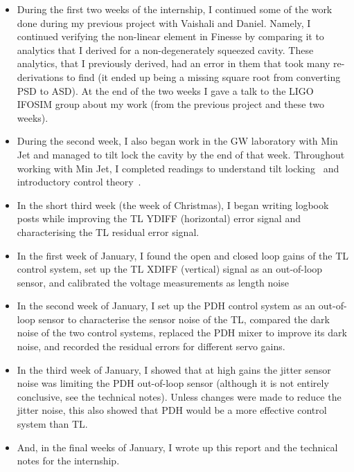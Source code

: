\documentclass[aps,pra,superscriptaddress,reprint,nofootinbib]{revtex4-1}
\begin{document}
\begin{itemize}
\item During the first two weeks of the internship, I continued some of the work done during my previous project with Vaishali and Daniel. Namely, I continued verifying the non-linear element in Finesse by comparing it to analytics that I derived for a non-degenerately squeezed cavity. These analytics, that I previously derived, had an error in them that took many re-derivations to find (it ended up being a missing square root from converting PSD to ASD).
At the end of the two weeks I gave a talk to the LIGO IFOSIM group about my work (from the previous project and these two weeks).
\item During the second week, I also began work in the GW laboratory with Min Jet and managed to tilt lock the cavity by the end of that week. Throughout working with Min Jet, I completed readings to understand tilt locking~\cite{TL:1999} and introductory control theory~\cite{Ward:2010,Bechhoefer:2005,FCS:2000}.
\item In the short third week (the week of Christmas), I began writing logbook posts while improving the TL YDIFF (horizontal) error signal and characterising the TL residual error signal.
\item In the first week of January, I found the open and closed loop gains of the TL control system, set up the TL XDIFF (vertical) signal as an out-of-loop sensor, and calibrated the voltage measurements as length noise
\item In the second week of January, I set up the PDH control system as an out-of-loop sensor to characterise the sensor noise of the TL, compared the dark noise of the two control systems, replaced the PDH mixer to improve its dark noise, and recorded the residual errors for different servo gains.
\item In the third week of January, I showed that at high gains the jitter sensor noise was limiting the PDH out-of-loop sensor (although it is not entirely conclusive, see the technical notes). Unless changes were made to reduce the jitter noise, this also showed that PDH would be a more effective control system than TL.
\item And, in the final weeks of January, I wrote up this report and the technical notes for the internship.
\end{itemize}


\end{document}
